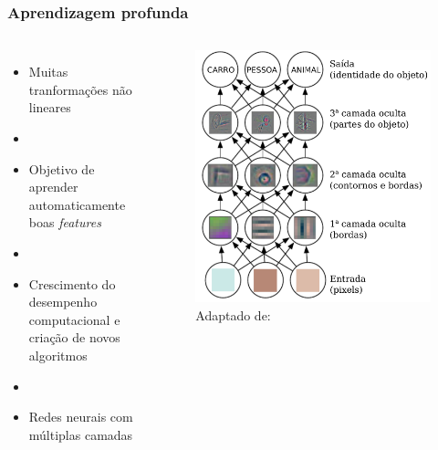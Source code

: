 \documentclass[10pt]{beamer}
\begin{document}
\begin{frame}[fragile]
  \frametitle{Aprendizagem profunda}

  \begin{columns}[onlytextwidth]
      
      \begin{itemize}
        \item Muitas tranformações não lineares
        \item[\ ] \ 
        \item Objetivo de aprender automaticamente boas \textit{features}
        \item[\ ] \ 
        \item Crescimento do desempenho computacional e criação de novos algoritmos
        \item[\ ] \ 
        \item Redes neurais com múltiplas camadas
      \end{itemize}

    \column{0.55\textwidth}
      
      \begin{figure}
      \begin{center}
        \includegraphics[scale=0.24]{img/aprendendodeep2.pdf}
      \end{center}
      \caption{Adaptado de: }
    \end{figure}
       

  \end{columns}
  

\end{frame}
\end{document}
